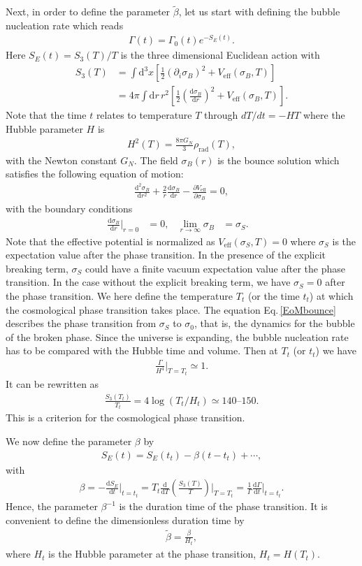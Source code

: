 \documentclass[a4paper,preprint,superscriptaddress,preprintnumbers,nofootinbib]{revtex4}
\newcommand{\al}[1]{\begin{align}#1\end{align}}
\newcommand{\nn}{\nonumber\\}
\newcommand{\p}{\partial}
\newcommand{\df}{\text{d}}
\newcommand{\fn}[1]{\!\left(#1\right)}
\begin{document}
\begin{appendix}
Next, in order to define the parameter $\tilde \beta$, let us start with defining the bubble nucleation rate which reads
\al{
\Gamma\fn{t} =\Gamma_0\fn{t}e^{-S_E\fn{t}}.
} 
Here $S_E\fn{t}=S_3\fn{T}/T$ is the three dimensional Euclidean action with
\al{
S_3\fn{T}&=\int \df^3x \left[ \frac{1}{2}(\p_i \sigma_B)^2 +V_\text{eff}\fn{\sigma_B,T} \right]\nn
&=4\pi \int \df r\,r^2 \left[ \frac{1}{2}\left( \frac{\df \sigma_B}{\df r}\right)^2 +V_\text{eff}\fn{\sigma_B,T} \right].
\label{eucideanaction}
}
Note that the time $t$ relates to temperature $T$ through $dT/dt=-HT$ where the Hubble parameter $H$ is
\al{
H^2\fn{T}=\frac{8\pi G_N}{3}\rho_\text{rad}\fn{T},
}
with the Newton constant $G_N$.
The field $\sigma_B\fn{r}$ is the bounce solution which satisfies the following equation of motion:
\al{
\frac{\df^2\sigma_B}{\df r^2} + \frac{2}{r}\frac{\df \sigma_B}{\df r} -\frac{\p V_\text{eff}}{\p \sigma_B}=0,
\label{EoMbounce}
}
with the boundary conditions
\al{
\frac{\df \sigma_B}{\df r}\bigg|_{r=0}&=0,&
\lim_{r\to \infty} \sigma_B&=\sigma_S.& 
\label{boundaryconditions}
}
Note that the effective potential is normalized as $V_\text{eff}\fn{\sigma_S,T}=0$ where $\sigma_S$ is the expectation value after the phase transition.
In the presence of the explicit breaking term, $\sigma_S$ could have a finite vacuum expectation value after the phase transition.
In the case without the explicit breaking term, we have $\sigma_S=0$ after the phase transition.
We here define the temperature $T_t$ (or the time $t_t$) at which the cosmological phase transition takes place.
The equation Eq.\,\eqref{EoMbounce} describes the phase transition from $\sigma_S$ to $\sigma_0$, that is, the dynamics for the bubble of the broken phase.
Since the universe is expanding, the bubble nucleation rate has to be compared with the Hubble time and volume.
Then at $T_t$ (or $t_t$) we have
\al{
\frac{\Gamma}{H^4}\bigg|_{T=T_t}\simeq 1.
}
It can be rewritten as
\al{
\frac{S_3\fn{T_t}}{T_t} 
=4\log\fn{T_t/H_t}
\simeq 140\text{--}150.
\label{phcriterion}
}
This is a criterion for the cosmological phase transition.

We now define the parameter $\beta$ by
\al{
S_E\fn{t}=S_E\fn{t_t} -\beta (t-t_t) +\cdots,
} 
with
\al{
\beta = -\frac{\df S_E}{\df t}\bigg|_{t=t_t}
=T_t\frac{\df}{\df T}\left( \frac{S_3\fn{T}}{T} \right)\bigg|_{T=T_t}
=\frac{1}{\Gamma} \frac{\df \Gamma}{\df t}\bigg|_{t=t_t}.
\label{betaparameter}
}
Hence, the parameter $\beta^{-1}$ is the duration time of the phase transition.
It is convenient to define the dimensionless duration time by
\al{
\tilde \beta= \frac{\beta}{H_t},
\label{tildebetaparameter}
}
where $H_t$ is the Hubble parameter at the phase transition, $H_t=H\fn{T_t}$.


\end{appendix}
\end{document}
